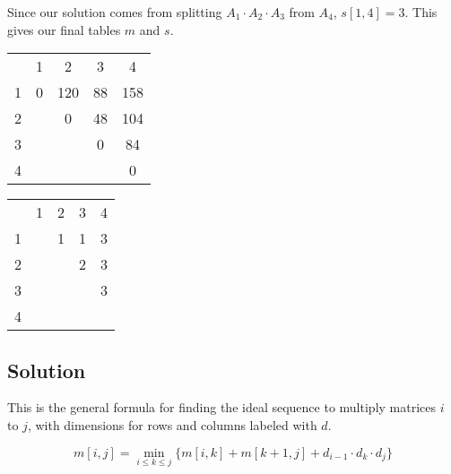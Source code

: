 \documentclass{article}
\begin{document}
Since our solution comes from splitting $A_1 \cdot A_2 \cdot A_3$ from $A_4$, $s[1, 4] = 3$. This gives our final tables $m$ and $s$.

\begin{center}
\label*{$m$}
\begin{tabular}{ c|c|c|c|c| }
    \multicolumn{1}{c}{}
    & \multicolumn{1}{c}{1}
    & \multicolumn{1}{c}{2}
    & \multicolumn{1}{c}{3}
    & \multicolumn{1}{c}{4}\\

    \cline{2-5}
        1 & 0 & 120 & 88 & 158 \\
    \cline{2-5}
        2 &  & 0 & 48 & 104 \\
    \cline{2-5}
        3 &  &  & 0 & 84 \\
    \cline{2-5}
        4 &  &  &  & 0 \\
    \cline{2-5}
\end{tabular}
\end{center}

\begin{center}
\label*{$s$}
\begin{tabular}{ c|c|c|c|c| }
    \multicolumn{1}{c}{}
    & \multicolumn{1}{c}{1}
    & \multicolumn{1}{c}{2}
    & \multicolumn{1}{c}{3}
    & \multicolumn{1}{c}{4}\\

    \cline{2-5}
        1 &  & 1 & 1 & 3 \\
    \cline{2-5}
        2 &  &  & 2 & 3 \\
    \cline{2-5}
        3 &  &  &  & 3 \\
    \cline{2-5}
        4 &  &  &  &  \\
    \cline{2-5}
\end{tabular}
\end{center}

\newpage

\subsection*{Solution}
This is the general formula for finding the ideal sequence to multiply matrices $i$ to $j$, with dimensions for rows and columns labeled with $d$.

\begin{equation*}
    m[i, j] = \min_{i \leq k \leq j}\{ m[i, k] + m[k+1, j] + d_{i-1} \cdot d_k \cdot d_j \}
\end{equation*}
\end{document}
